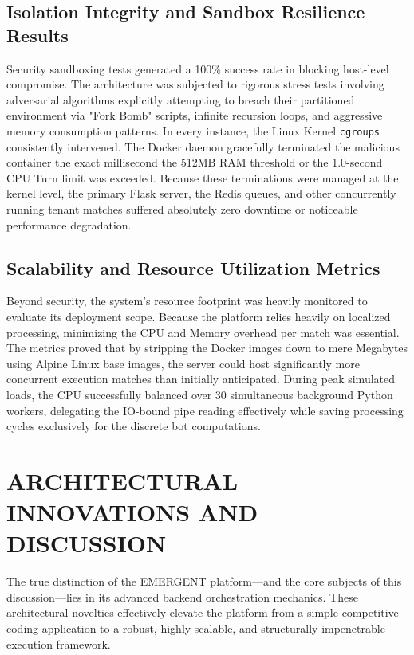 \documentclass[12pt,a4paper]{report}
\begin{document}
\subsection{Isolation Integrity and Sandbox Resilience Results}
Security sandboxing tests generated a 100\% success rate in blocking host-level compromise. The architecture was subjected to rigorous stress tests involving adversarial algorithms explicitly attempting to breach their partitioned environment via "Fork Bomb" scripts, infinite recursion loops, and aggressive memory consumption patterns. In every instance, the Linux Kernel \texttt{cgroups} consistently intervened. The Docker daemon gracefully terminated the malicious container the exact millisecond the 512MB RAM threshold or the 1.0-second CPU Turn limit was exceeded. Because these terminations were managed at the kernel level, the primary Flask server, the Redis queues, and other concurrently running tenant matches suffered absolutely zero downtime or noticeable performance degradation.

\subsection{Scalability and Resource Utilization Metrics}
Beyond security, the system's resource footprint was heavily monitored to evaluate its deployment scope. Because the platform relies heavily on localized processing, minimizing the CPU and Memory overhead per match was essential. The metrics proved that by stripping the Docker images down to mere Megabytes using Alpine Linux base images, the server could host significantly more concurrent execution matches than initially anticipated. During peak simulated loads, the CPU successfully balanced over 30 simultaneous background Python workers, delegating the IO-bound pipe reading effectively while saving processing cycles exclusively for the discrete bot computations.

\section{ARCHITECTURAL INNOVATIONS AND DISCUSSION}
The true distinction of the EMERGENT platform—and the core subjects of this discussion—lies in its advanced backend orchestration mechanics. These architectural novelties effectively elevate the platform from a simple competitive coding application to a robust, highly scalable, and structurally impenetrable execution framework.
\end{document}
